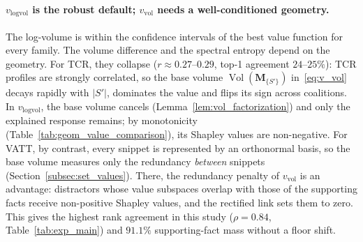 \paragraph{$v_{\text{logvol}}$ is the robust default; $v_{\text{vol}}$ needs a well-conditioned geometry.}
The log-volume is within the confidence intervals of the best value function for every family. The volume difference and the spectral entropy depend on the geometry. For TCR, they collapse ($r \approx 0.27$--$0.29$, top-1 agreement $24$--$25\%$): TCR profiles are strongly correlated, so the base volume $\operatorname{Vol}(\mathbf{M}_{\{S'\}})$ in~\eqref{eq:v_vol} decays rapidly with $|S'|$, dominates the value and flips its sign across coalitions. In $v_{\text{logvol}}$, the base volume cancels (Lemma~\ref{lem:vol_factorization}) and only the explained response remains; by monotonicity (Table~\ref{tab:geom_value_comparison}), its Shapley values are non-negative. For VATT, by contrast, every snippet is represented by an orthonormal basis, so the base volume measures only the redundancy \emph{between} snippets (Section~\ref{subsec:set_values}). There, the redundancy penalty of $v_{\text{vol}}$ is an advantage: distractors whose value subspaces overlap with those of the supporting facts receive non-positive Shapley values, and the rectified link sets them to zero. This gives the highest rank agreement in this study ($\rho = 0.84$, Table~\ref{tab:exp_main}) and $91.1\%$ supporting-fact mass without a floor shift.

